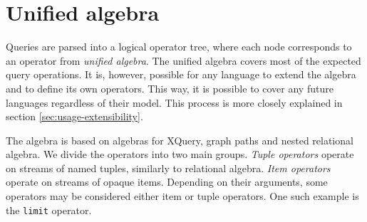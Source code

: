 \section{Unified algebra}
\label{sec:algebra}

Queries are parsed into a logical operator tree, where each node corresponds to an operator from \textit{unified algebra}. The unified algebra covers most of the expected query operations. It is, however, possible for any language to extend the algebra and to define its own operators. This way, it is possible to cover any future languages regardless of their model. This process is more closely explained in section \ref{sec:usage-extensibility}.


The algebra is based on algebras for XQuery\cite{xquery_algebra}, graph paths\cite{angles2024path} and nested relational algebra\cite{schek1986relational}. We divide the operators into two main groups. \textit{Tuple operators} operate on streams of named tuples, similarly to relational algebra. \textit{Item operators} operate on streams of opaque items. Depending on their arguments, some operators may be considered either item or tuple operators. One such example is the \texttt{limit} operator.

